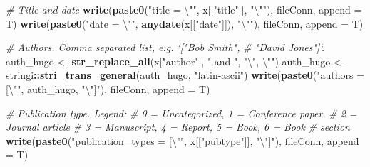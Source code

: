 \documentclass[12pt,]{book}
\newenvironment{Shaded}{\begin{snugshade}}{\end{snugshade}}
\newcommand{\KeywordTok}[1]{\textcolor[rgb]{0.13,0.29,0.53}{\textbf{#1}}}
\newcommand{\DataTypeTok}[1]{\textcolor[rgb]{0.13,0.29,0.53}{#1}}
\newcommand{\CharTok}[1]{\textcolor[rgb]{0.31,0.60,0.02}{#1}}
\newcommand{\StringTok}[1]{\textcolor[rgb]{0.31,0.60,0.02}{#1}}
\newcommand{\CommentTok}[1]{\textcolor[rgb]{0.56,0.35,0.01}{\textit{#1}}}
\newcommand{\OperatorTok}[1]{\textcolor[rgb]{0.81,0.36,0.00}{\textbf{#1}}}
\newcommand{\NormalTok}[1]{#1}
\theoremstyle{definition}
\theoremstyle{definition}
\theoremstyle{definition}
\theoremstyle{remark}
\begin{document}
\begin{Shaded}
\begin{Highlighting}[]
{{{{{{                             \CommentTok{# Title and date}
                             \KeywordTok{write}\NormalTok{(}\KeywordTok{paste0}\NormalTok{(}\StringTok{"title = }\CharTok{\textbackslash{}"}\StringTok{"}\NormalTok{, x[[}\StringTok{"title"}\NormalTok{]], }\StringTok{"}\CharTok{\textbackslash{}"}\StringTok{"}\NormalTok{),}
\NormalTok{                             fileConn,}
                             \DataTypeTok{append =}\NormalTok{ T)}
                             \KeywordTok{write}\NormalTok{(}\KeywordTok{paste0}\NormalTok{(}\StringTok{"date = }\CharTok{\textbackslash{}"}\StringTok{"}\NormalTok{, }\KeywordTok{anydate}\NormalTok{(x[[}\StringTok{"date"}\NormalTok{]]), }\StringTok{"}\CharTok{\textbackslash{}"}\StringTok{"}\NormalTok{),}
\NormalTok{                             fileConn,}
                             \DataTypeTok{append =}\NormalTok{ T)}
                             
                             \CommentTok{# Authors. Comma separated list, e.g. `["Bob Smith", }
                             \CommentTok{# "David Jones"]`.}
\NormalTok{                             auth_hugo <-}
\StringTok{                             }\KeywordTok{str_replace_all}\NormalTok{(x[}\StringTok{"author"}\NormalTok{], }\StringTok{" and "}\NormalTok{, }\StringTok{"}\CharTok{\textbackslash{}"}\StringTok{, }\CharTok{\textbackslash{}"}\StringTok{"}\NormalTok{)}
\NormalTok{                             auth_hugo <-}
\StringTok{                             }\NormalTok{stringi}\OperatorTok{::}\KeywordTok{stri_trans_general}\NormalTok{(auth_hugo, }\StringTok{"latin-ascii"}\NormalTok{)}
                             \KeywordTok{write}\NormalTok{(}\KeywordTok{paste0}\NormalTok{(}\StringTok{"authors = [}\CharTok{\textbackslash{}"}\StringTok{"}\NormalTok{, auth_hugo, }\StringTok{"}\CharTok{\textbackslash{}"}\StringTok{]"}\NormalTok{),}
\NormalTok{                             fileConn,}
                             \DataTypeTok{append =}\NormalTok{ T)}
                             
                             \CommentTok{# Publication type. Legend:}
                             \CommentTok{# 0 = Uncategorized, 1 = Conference paper, }
                             \CommentTok{# 2 = Journal article}
                             \CommentTok{# 3 = Manuscript, 4 = Report, 5 = Book,  6 = Book}
                             \CommentTok{# section}
                             \KeywordTok{write}\NormalTok{(}\KeywordTok{paste0}\NormalTok{(}\StringTok{"publication_types = [}\CharTok{\textbackslash{}"}\StringTok{"}\NormalTok{, x[[}\StringTok{"pubtype"}\NormalTok{]],}
                                          \StringTok{"}\CharTok{\textbackslash{}"}\StringTok{]"}\NormalTok{),}
\NormalTok{                             fileConn,}
                             \DataTypeTok{append =}\NormalTok{ T)}
                             
}}}}}}
\end{Highlighting}
\end{Shaded}
\end{document}
